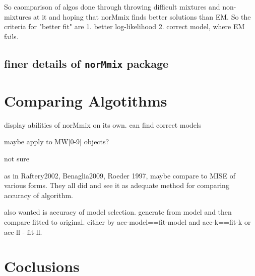So caomparison of algos done through throwing difficult mixtures and non-mixtures at it and hoping that norMmix finds better solutions than EM. So the criteria for "better fit" are 1. better log-likelihood 2. correct model, where EM fails.

\section{finer details of {\tt norMmix} package}




\chapter{Comparing Algotithms}

display abilities of norMmix on its own. can find correct models

maybe apply to MW[0-9] objects?

not sure

as in Raftery2002, Benaglia2009, Roeder 1997, maybe compare to MISE of various forms. They all did and see it as adequate method for comparing accuracy of algorithm.

also wanted is accuracy of model selection. generate from model and then compare fitted to original. either by acc-model==fit-model and acc-k==fit-k or acc-ll - fit-ll.


\chapter{Coclusions}

